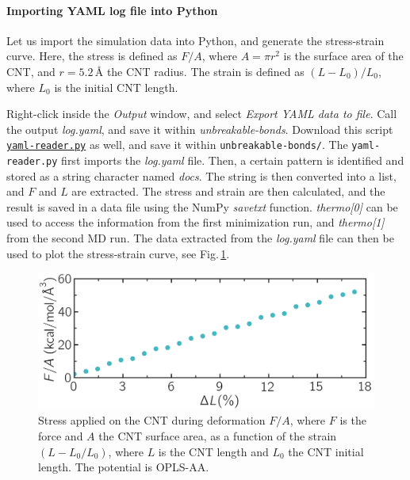 \documentclass[9pt,tutorial]{livecoms}
\newcommand{\flrcmd}[1]{\textcolor{command}{\texttt{#1}}} %
\newcommand{\flecmd}[1]{\textcolor{command}{\texttt{#1}}} %
\newcommand{\dwlcmd}[1]{\textcolor{download}{\texttt{#1}}} %
\newcommand{\filepath}{https://raw.githubusercontent.com/lammpstutorials/lammpstutorials-article/main/files/}
\begin{document}
\paragraph{Importing YAML log file into Python}

Let us import the simulation data into Python, and generate the stress-strain curve.
Here, the stress is defined as $F/A$, where $A = \pi r^2$ is the surface area of the
CNT, and $r=5.2$\,\AA{} the CNT radius. The strain is defined as $(L-L_0)/L_0$,
where $L_0$ is the initial CNT length.

Right-click inside the \textit{Output} window, and select
\textit{Export YAML data to file}. Call the output \textit{log.yaml}, and save
it within \textit{unbreakable-bonds}. Download this script
\href{\filepath tutorial2/unbreakable-bonds/yaml-reader.py}{\dwlcmd{yaml-reader.py}} as well, and save it
within \flrcmd{unbreakable-bonds/}. The \flecmd{yaml-reader.py} first imports
the \textit{log.yaml} file. Then, a certain pattern is
identified and stored as a string character named \textit{docs}. The string is
then converted into a list, and $F$ and $L$ are extracted. The stress and strain
are then calculated, and the result is saved in a data file using the
NumPy \textit{savetxt} function. \textit{thermo[0]} can be used to access the
information from the first minimization run, and \textit{thermo[1]} from
the second MD run. The data extracted from the \textit{log.yaml} file can
then be used to plot the stress-strain curve, see
Fig.\,\ref{fig:CNT-stress-strain-unbreakable}.

\begin{figure}
\centering
\includegraphics[width=\linewidth]{CNT-stress-strain-unbreakable}
\caption{Stress applied on the CNT during deformation $F/A$, where $F$ is the force
and $A$ the CNT surface area, as a function of the strain $(L-L_0/L_0)$, where
$L$ is the CNT length and $L_0$ the CNT initial length. The potential is OPLS-AA.}
\label{fig:CNT-stress-strain-unbreakable}
\end{figure}
\end{document}
